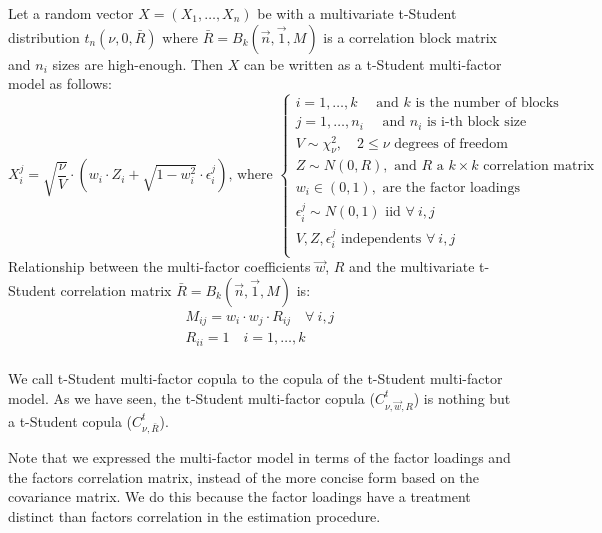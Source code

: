 \documentclass[11pt,fleqn]{book} %
\begin{document}
\begin{proposition}
	\label{prop:tmfm}
	Let a random vector $X=(X_1,\dots,X_n)$ be with a multivariate t-Student 
	distribution $t_n(\nu,0,\bar{R})$ where $\bar{R} = B_k(\vec{n},\vec{1},M)$ 
	is a correlation block matrix and $n_i$ sizes are high-enough. 
	Then $X$ can be written as a t-Student multi-factor model as follows:
	\begin{displaymath}
		X_i^j = \sqrt{\frac{\nu}{V}} \cdot 
		\left( w_i \cdot Z_i + \sqrt{1-w_i^2} \cdot \epsilon_i^j \right)
		\text{, where } \left\{
		\begin{array}{l}
			i = 1, \dots, k \quad \text{ and $k$ is the number of blocks}      \\
			j = 1, \dots, n_i \quad \text{ and $n_i$ is i-th block size}       \\
			V \sim \chi_{\nu}^2, \quad 2 \le \nu \text{ degrees of freedom}    \\
			Z \sim N(0,R), \text{ and $R$ a $k {\times} k$ correlation matrix} \\
			w_i \in (0,1), \text{ are the factor loadings }                    \\
			\epsilon_i^j \sim N(0,1) \text { iid } \forall\ i,j                \\
			V, Z, \epsilon_i^j \text{ independents } \forall\ i,j              \\
		\end{array}
		\right.
	\end{displaymath}
	Relationship between the multi-factor coefficients $\vec{w}$, $R$ and the
	multivariate t-Student correlation matrix $\bar{R} = B_k(\vec{n},\vec{1},M)$ 
	is:
	\begin{displaymath}
		\begin{array}{l}
			M_{ij} = w_i \cdot w_j \cdot R_{ij} \quad \forall\ i,j \\
			R_{ii} = 1 \quad i = 1,\dots,k \\
		\end{array}
	\end{displaymath}
\end{proposition}

We call t-Student multi-factor copula to the copula of the t-Student multi-factor 
model. As we have seen, the t-Student multi-factor copula ($C_{\nu,\vec{w},R}^t$) 
is nothing but a t-Student copula ($C_{\nu,\bar{R}}^t$).

Note that we expressed the multi-factor model in terms of the factor 
loadings and the factors correlation matrix, instead of the more concise 
form based on the covariance matrix. We do this because the factor loadings 
have a treatment distinct than factors correlation in the estimation procedure.
\end{document}
